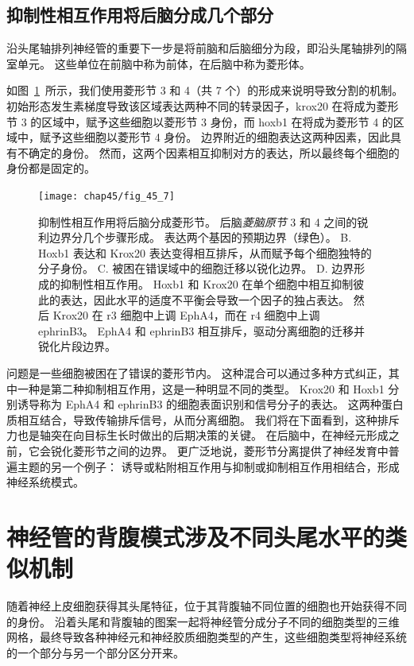 \subsection{抑制性相互作用将后脑分成几个部分}

沿头尾轴排列神经管的重要下一步是将前脑和后脑细分为段，即沿头尾轴排列的隔室单元。
这些单位在前脑中称为前体，在后脑中称为菱形体。


如图~\ref{fig:45_7}~所示，我们使用菱形节 3 和 4（共 7 个）的形成来说明导致分割的机制。
初始形态发生素梯度导致该区域表达两种不同的转录因子，krox20 在将成为菱形节 3 的区域中，赋予这些细胞以菱形节 3 身份，而 hoxb1 在将成为菱形节 4 的区域中，赋予这些细胞以菱形节 4 身份。
边界附近的细胞表达这两种因素，因此具有不确定的身份。
然而，这两个因素相互抑制对方的表达，所以最终每个细胞的身份都是固定的。


\begin{figure}[htbp]
	\centering
	\texttt{[image: chap45/fig\_45\_7]}
	\caption{抑制性相互作用将后脑分成菱形节。
		后脑\textit{菱脑原节} 3 和 4 之间的锐利边界分几个步骤形成\cite{addison2016segment}。
		表达两个基因的预期边界（绿色）。
		B. Hoxb1 表达和 Krox20 表达变得相互排斥，从而赋予每个细胞独特的分子身份。
		C. 被困在错误域中的细胞迁移以锐化边界。
		D. 边界形成的抑制性相互作用。
		Hoxb1 和 Krox20 在单个细胞中相互抑制彼此的表达，因此水平的适度不平衡会导致一个因子的独占表达。
		然后 Krox20 在 r3 细胞中上调 EphA4，而在 r4 细胞中上调 ephrinB3。
		EphA4 和 ephrinB3 相互排斥，驱动分离细胞的迁移并锐化片段边界。}
	\label{fig:45_7}
\end{figure}


问题是一些细胞被困在了错误的菱形节内。
这种混合可以通过多种方式纠正，其中一种是第二种抑制相互作用，这是一种明显不同的类型。
Krox20 和 Hoxb1 分别诱导称为 EphA4 和 ephrinB3 的细胞表面识别和信号分子的表达。
这两种蛋白质相互结合，导致传输排斥信号，从而分离细胞。
我们将在下面看到，这种排斥力也是轴突在向目标生长时做出的后期决策的关键。
在后脑中，在神经元形成之前，它会锐化菱形节之间的边界。
更广泛地说，菱形节分离提供了神经发育中普遍主题的另一个例子：
诱导或粘附相互作用与抑制或抑制相互作用相结合，形成神经系统模式。




\section{神经管的背腹模式涉及不同头尾水平的类似机制}

随着神经上皮细胞获得其头尾特征，位于其背腹轴不同位置的细胞也开始获得不同的身份。
沿着头尾和背腹轴的图案一起将神经管分成分子不同的细胞类型的三维网格，最终导致各种神经元和神经胶质细胞类型的产生，这些细胞类型将神经系统的一个部分与另一个部分区分开来。


